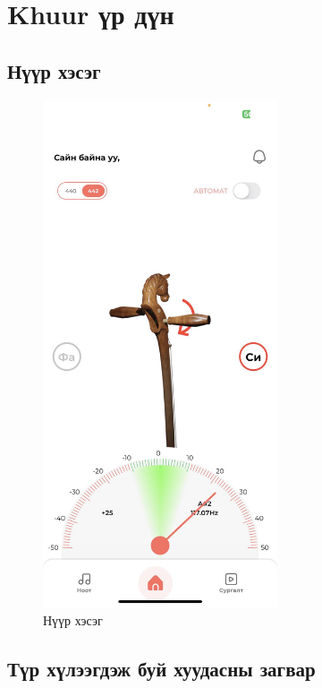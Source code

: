 \section{Khuur үр дүн}
\subsection{Нүүр хэсэг}

\begin{figure}
	\centering
	\includegraphics[height=15cm]{images/khuur-app1.jpg}
	\caption{Нүүр хэсэг}
	\label{fig:homepage}
\end{figure}
\pagebreak

\subsection{Түр хүлээгдэж буй хуудасны загвар}

